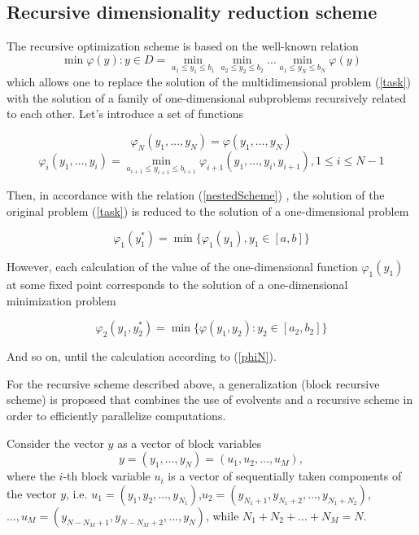 \documentclass{svproc}
\begin{document}
\subsection{Recursive dimensionality reduction scheme}

The recursive optimization scheme is based on the well-known relation \cite{Ref22}
\begin{equation}
\label{nestedScheme}
\min{\varphi(y):y\in D}=\min_{a_1\leqslant y_1\leqslant b_1}\min_{a_2\leqslant y_2\leqslant b_2}\dots\min_{a_1\leqslant y_N\leqslant b_N}\varphi(y)
\end{equation}
which allows one to replace the solution of the multidimensional problem (\ref{task}) with the solution of a family of one-dimensional subproblems recursively related to each other.
Let's introduce a set of functions

\begin{equation}
\label{phiN}
\varphi_N(y_1,\dots,y_N)=\varphi(y_1,\dots,y_N)
\end{equation}
\begin{equation}
\label{phiI_}
\varphi_i(y_1,\dots,y_i)=\min_{a_{i+1}\leqslant y_{i+1} \leqslant b_{i+1}}\varphi_{i+1}(y_1,\dots,y_i,y_{i+1}),1\leqslant i\leqslant N-1
\end{equation}

Then, in accordance with the relation (\ref{nestedScheme}) , the solution of the original problem (\ref{task}) is reduced to the solution of a one-dimensional problem

\begin{equation}
\label{phiFirst}
\varphi_1(y_1^*)=\min\{\varphi_1(y_1),y_1\in [a,b]\}
\end{equation}

However, each calculation of the value of the one-dimensional function  \(\varphi_1(y_1)\) at some fixed point corresponds to the solution of a one-dimensional minimization problem 

\begin{displaymath}
\label{phi2}
\varphi_2(y_1,y_2^*)=\min\{\varphi(y_1,y_2):y_2\in [a_2,b_2]\}
\end{displaymath}

And so on, until the calculation   according to (\ref{phiN}). 

For the recursive scheme described above, a generalization (block recursive scheme) is proposed that combines the use of evolvents and a recursive scheme in order to efficiently parallelize computations.

Consider the vector $y$ as a vector of block variables
\begin{displaymath}
y=(y_1,\dots,y_N)=(u_1,u_2,\dots,u_M),
\end{displaymath}
where the \(i\)-th block variable \(u_i\) is a vector of sequentially taken components of the vector \(y\), i.e. $u_1=(y_1,y_2,\dots,y_{N_1})$,$u_2=(y_{N_1+1},y_{N_1+2},\dots,y_{N_1+N_2})$,$\dots,u_M=(y_{N-N_M+1},y_{N-N_M+2},\dots,y_N)$, while \(N_1+N_2+\dots+N_M=N\).
\end{document}
